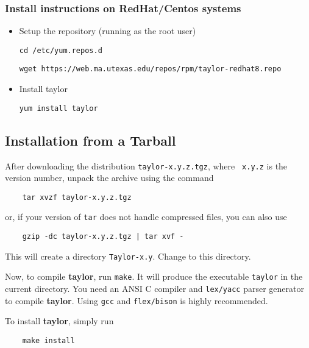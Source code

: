 \documentclass[10pt]{article}
\theoremstyle{remark}
\newcommand{\taylorname}{{\bf taylor}}
\begin{document}
\subsubsection*{Install instructions on RedHat/Centos systems}
\begin{itemize}
    \item {Setup the repository (running as the root user)
    
    \tt{cd /etc/yum.repos.d}

    \tt{wget https://web.ma.utexas.edu/repos/rpm/taylor-redhat8.repo}
    }
    \item{Install taylor
    
    \tt{yum install taylor}
    
    }
\end{itemize}

\subsection{Installation from a Tarball}
After downloading the distribution {\tt taylor-x.y.z.tgz}, where {\tt
  x.y.z} is the version number, unpack the archive using the command
\begin{verbatim}
    tar xvzf taylor-x.y.z.tgz
\end{verbatim}
\noindent
or, if your version of {\tt tar} does not handle compressed files, you
can also use

\begin{verbatim}
    gzip -dc taylor-x.y.z.tgz | tar xvf - 
\end{verbatim}

\noindent
This will create a directory {\tt Taylor-x.y}.  Change to this
directory.

Now, to compile \taylorname{}, run {\tt make}.  It will produce the
executable {\tt taylor} in the current directory.  You need an ANSI C
compiler and {\tt lex/yacc} parser generator to compile
\taylorname{}. Using {\tt gcc} and {\tt flex/bison} is highly
recommended.

To install \taylorname{}, simply run
\begin{verbatim}
    make install 
\end{verbatim}
\end{document}
